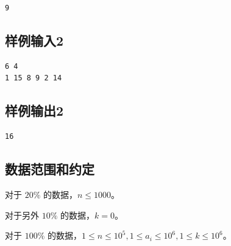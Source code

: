 \begin{lstlisting}
9
\end{lstlisting}

\subsection{样例输入2}

\begin{lstlisting}
6 4
1 15 8 9 2 14
\end{lstlisting}

\subsection{样例输出2}

\begin{lstlisting}
16
\end{lstlisting}


\subsection{数据范围和约定}

对于 $20\%$ 的数据，$n \le 1000$。

对于另外 $10\%$ 的数据，$k = 0$。

对于 $100\%$ 的数据，$1 \le n \le 10^5,1 \le a_i \le 10^6,1 \le k \le 10^6$。
